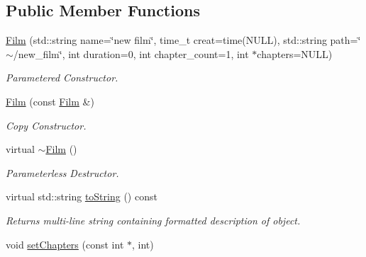 \subsection*{Public Member Functions}
\begin{DoxyCompactItemize}
\item 
\hypertarget{classFilm_a6ea805a054e1f43ec3963daf58ac7dd4}{\hyperlink{classFilm_a6ea805a054e1f43ec3963daf58ac7dd4}{Film} (std\-::string name=\char`\"{}new film\char`\"{}, time\-\_\-t creat=time(N\-U\-L\-L), std\-::string path=\char`\"{}$\sim$/new\-\_\-film\char`\"{}, int duration=0, int chapter\-\_\-count=1, int $\ast$chapters=N\-U\-L\-L)}\label{classFilm_a6ea805a054e1f43ec3963daf58ac7dd4}

\begin{DoxyCompactList}\small\item\em Parametered Constructor. \end{DoxyCompactList}\item 
\hypertarget{classFilm_a34c9de2efb9554ce1192e4110d98806b}{\hyperlink{classFilm_a34c9de2efb9554ce1192e4110d98806b}{Film} (const \hyperlink{classFilm}{Film} \&)}\label{classFilm_a34c9de2efb9554ce1192e4110d98806b}

\begin{DoxyCompactList}\small\item\em Copy Constructor. \end{DoxyCompactList}\item 
virtual \hyperlink{classFilm_a8dab653f8a6c0635ca5ddbe0bbdd9a25}{$\sim$\-Film} ()
\begin{DoxyCompactList}\small\item\em Parameterless Destructor. \end{DoxyCompactList}\item 
\hypertarget{classFilm_ab88f7ac028cd45da81c96a50a2990fee}{virtual std\-::string \hyperlink{classFilm_ab88f7ac028cd45da81c96a50a2990fee}{to\-String} () const }\label{classFilm_ab88f7ac028cd45da81c96a50a2990fee}

\begin{DoxyCompactList}\small\item\em Returns multi-\/line string containing formatted description of object. \end{DoxyCompactList}\item 
\hypertarget{classFilm_ab0c2831b76a6b932dfc4a6facc38870c}{void \hyperlink{classFilm_ab0c2831b76a6b932dfc4a6facc38870c}{set\-Chapters} (const int $\ast$, int)}\label{classFilm_ab0c2831b76a6b932dfc4a6facc38870c}


\end{DoxyCompactItemize}
